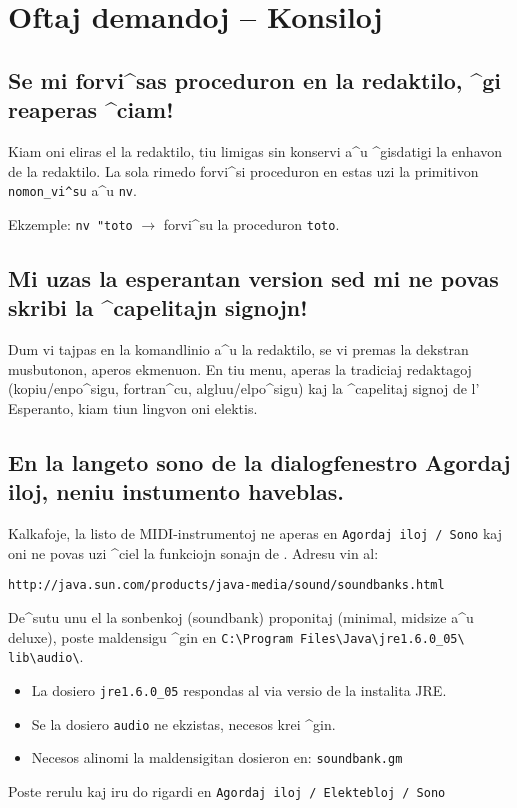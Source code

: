 \chapter{Oftaj demandoj -- Konsiloj}

\section{Se mi forvi^sas proceduron en la redaktilo, ^gi reaperas
  ^ciam!}

Kiam oni eliras el la redaktilo, tiu limigas sin konservi a^u
^gisdatigi la enhavon de la redaktilo.  La sola rimedo forvi^si
proceduron en \xlogo{} estas uzi la primitivon \texttt{nomon\_vi^su}
a^u \texttt{nv}.

Ekzemple: \texttt{nv "toto} $\longrightarrow$ forvi^su la proceduron
\texttt{toto}.

\section{Mi uzas la esperantan version sed mi ne povas skribi la
  ^capelitajn signojn!}

Dum vi tajpas en la komandlinio a^u la redaktilo, se vi premas la
dekstran musbutonon, aperos ekmenuon.  En tiu menu, aperas la
tradiciaj redaktagoj (kopiu/enpo^sigu, fortran^cu, algluu/elpo^sigu)
kaj la ^capelitaj signoj de l' Esperanto, kiam tiun lingvon oni
elektis.

\section{En la langeto sono de la dialogfenestro Agordaj iloj, neniu instumento haveblas.}

Kalkafoje, la listo de MIDI-instrumentoj ne aperas en \texttt{Agordaj
  iloj / Sono} kaj oni ne povas uzi ^ciel la funkciojn sonajn de
\xlogo{}.  Adresu vin al:
\begin{center}
 \texttt{http://java.sun.com/products/java-media/sound/soundbanks.html}
\end{center}
De^sutu unu el la sonbenkoj (soundbank) proponitaj (minimal, midsize
a^u deluxe), poste maldensigu ^gin en \texttt{C:\textbackslash Program
  Files\textbackslash Java\textbackslash jre1.6.0\_05\textbackslash
  lib\textbackslash audio\textbackslash}.

\begin{itemize}
\item La dosiero \texttt{jre1.6.0\_05} respondas al via versio de la
  instalita JRE.
 \item Se la dosiero \texttt{audio} ne ekzistas, necesos krei ^gin.
 \item Necesos alinomi la maldensigitan dosieron en:
   \texttt{soundbank.gm}
\end{itemize}
\vspace{0.2cm}
Poste rerulu \xlogo{} kaj iru do rigardi en \texttt{Agordaj iloj / Elektebloj / Sono}

